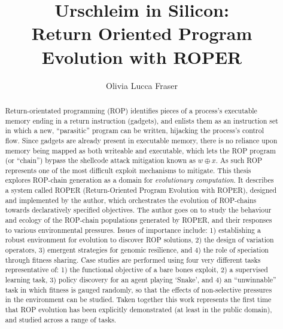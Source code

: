 \title{Urschleim in Silicon:\\Return Oriented Program\\Evolution with ROPER}
\author{Olivia Lucca Fraser}

\mcs
{}

\frontmatter

\begin{abstract}
Return-orientated programming (ROP) identifies pieces of a process's
executable memory ending in a return instruction (gadgets), and enlists them as
an instruction set in which a new, ``parasitic'' program can be written,
hijacking the process's control flow. Since gadgets are already present in
executable memory, there is no reliance upon memory being mapped as both
writeable and executable, which lets the ROP program (or ``chain'') bypass the
shellcode attack mitigation known as $w\oplus x$. As such ROP represents one of
the most difficult exploit mechanisms to mitigate. This thesis explores
ROP-chain generation as a domain for \emph{evolutionary computation}. It
describes a system called ROPER (Return-Oriented Program Evolution with ROPER),
designed and implemented by the author, which orchestrates the evolution of
ROP-chains towards declaratively specified objectives. The author goes on to
study the behaviour and ecology of the ROP-chain populations generated by ROPER,
and their responses to various environmental pressures.
Issues of importance include: 1) establishing a robust environment for evolution
to discover ROP solutions, 2) the design of variation operators, 3) emergent
strategies for genomic resilience, and 4) the role
of speciation through fitness sharing. Case studies are performed using four very
different tasks representative of: 1) the functional objective of a bare bones
exploit, 2) a supervised learning task, 3) policy discovery for an agent playing
‘Snake’, and 4) an ``unwinnable'' task in which fitness is gauged randomly, so
that the effects of non-selective pressures in the environment can be studied.
Taken together this work represents the first time that ROP evolution has been
explicitly demonstrated (at least in the public domain), and studied across
a range of tasks.
\end{abstract}


